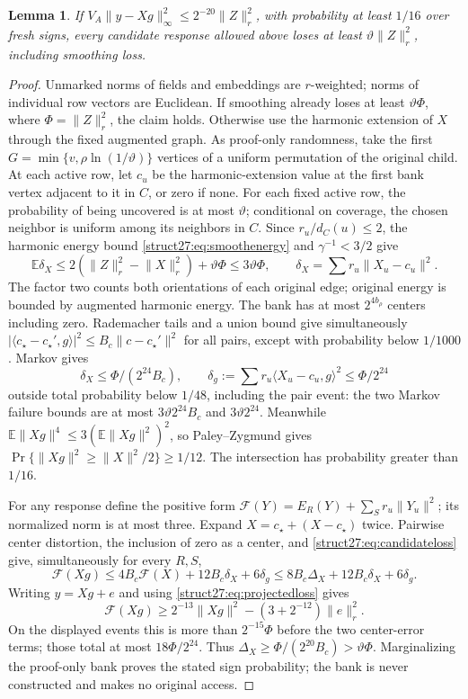 \documentclass[11pt]{article}
\newtheorem{lemma}[theorem]{Lemma}
\theoremstyle{remark}
\newcommand{\Ex}{\mathbb E}
\newcommand{\norm}[1]{\lVert#1\rVert}
\begin{document}
\begin{lemma}\label{struct27:lem:uniform}
If $V_A\norm{y-Xg}_\infty^2\le2^{-20}\norm{Z}_r^2$, with probability at least
$1/16$ over fresh signs, every candidate response allowed above loses at least
$\vartheta\norm{Z}_r^2$, including smoothing loss.
\end{lemma} \begin{proof} Unmarked norms of fields and embeddings are
$r$-weighted; norms of individual row vectors are Euclidean.
If smoothing already loses at least $\vartheta\Phi$, where $\Phi=\norm{Z}_r^2$,
the claim holds.
Otherwise use the harmonic extension of $X$ through the fixed augmented graph.
As proof-only randomness, take the first $G=\min\{v, \rho\ln(1/\vartheta) \}$ vertices of a uniform permutation of the original
child.
At each active row, let $c_u$ be the harmonic-extension value at the first bank
vertex adjacent to it in $C$, or zero if none.
For each fixed active row, the probability of being uncovered is at most
$\vartheta$; conditional on coverage, the chosen neighbor is uniform among its
neighbors in $C$.
Since $r_u/d_C(u)\le2$, the harmonic energy bound
\eqref{struct27:eq:smoothenergy} and $\gamma^{-1}<3/2$ give
\[
 \Ex\delta_X\le2(\norm{Z}_r^2-\norm{X}_r^2)+\vartheta\Phi
 \le3\vartheta\Phi,
 \qquad\delta_X=\sum r_u\norm{X_u-c_u}^2.
\]
The factor two counts both orientations of each original edge; original energy
is bounded by augmented harmonic energy.
The bank has at most $2^{4b_\rho}$ centers including zero.
Rademacher tails and a union bound give simultaneously $|\langle
c_\star-c_\star',g\rangle|^2\le B_c\norm{c-c_\star'}^2$ for all pairs, except with probability
below $1/1000$.
Markov gives
\[
 \delta_X\le\Phi/(2^{24}B_c),\qquad
 \delta_g:=\sum r_u\langle X_u-c_u,g\rangle^2\le\Phi/2^{24}
\]
outside total probability below $1/48$, including the pair event: the two Markov
failure bounds are at most $3\vartheta2^{24}B_c$ and $3\vartheta2^{24}$.
Meanwhile $\Ex\norm{Xg}^4\le3(\Ex\norm{Xg}^2)^2$, so Paley--Zygmund gives
$\Pr\{\norm{Xg}^2\ge\norm{X}^2/2\}\ge1/12$.
The intersection has probability greater than $1/16$.

For any response define the positive form $\mathcal
F(Y)=E_R(Y)+\sum_Sr_u\norm{Y_u}^2$; its normalized norm is at most three.
Expand $X=c_\star+(X-c_\star)$ twice.
Pairwise center distortion, the inclusion of zero as a center, and
\eqref{struct27:eq:candidateloss} give, simultaneously for every $R,S$,
\begin{equation}\label{struct27:eq:uniformform}
 \mathcal F(Xg)\le4B_c\mathcal F(X)+12B_c\delta_X+6\delta_g
 \le8B_c\Delta_X+12B_c\delta_X+6\delta_g.
\end{equation}
Writing $y=Xg+e$ and using \eqref{struct27:eq:projectedloss} gives
\[
 \mathcal F(Xg)\ge2^{-13}\norm{Xg}^2-(3+2^{-12})\norm{e}_r^2.
\]
On the displayed events this is more than $2^{-15}\Phi$ before the two
center-error terms; those total at most $18\Phi/2^{24}$.
Thus $\Delta_X\ge\Phi/(2^{20}B_c)>\vartheta\Phi$.
Marginalizing the proof-only bank proves the stated sign probability; the bank
is never constructed and makes no original access.
\end{proof}
\end{document}
